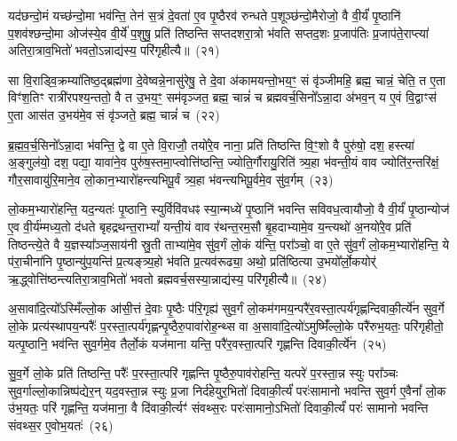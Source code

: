 यद॑छन्दो॒मं यच्छ॑न्दो॒मा भव॑न्ति॒ तेन॑ स॒त्रं दे॒वता॑ ए॒व पृ॒ष्ठैरव॑ रुन्धते प॒शूञ्छ॑न्दो॒मैरोजो॒ वै वी॒र्यं॑ पृ॒ष्ठानि॑ प॒शव॑श्छन्दो॒मा ओज॑स्ये॒व वी॒र्ये॑ प॒शुषु॒ प्रति॑ तिष्ठन्ति सप्तदशरा॒त्रो भ॑वति सप्तद॒शः प्र॒जा\-प॑तिः प्र॒जाप॑ते॒राप्त्या॑ अतिरा॒त्राव॒भितो॑ भवतो॒\-ऽन्नाद्य॑स्य॒ परि॑गृहीत्यै॥~(२१)

{\anuvakamend[{ए॒तथ्स॒प्तत्रिꣴ॑श्चच्च}]}%

सा वि॒राड्वि॒क्रम्या॑तिष्ठ॒द्ब्रह्म॑णा दे॒वेष्वन्ने॒नासु॑रेषु॒ ते दे॒वा अ॑कामयन्तो॒भय॒ꣳ॒ सं वृ॑ञ्जीमहि॒ ब्रह्म॒ चान्नं॒ चेति॒ त ए॒ता विꣳ॑श॒तिꣳ रात्री॑रपश्य॒न्ततो॒ वै त उ॒भय॒ꣳ॒ सम॑वृञ्जत॒ ब्रह्म॒ चान्नं॑ च ब्रह्मवर्च॒सिनो᳚\-ऽन्ना॒दा अ॑भव॒न् य ए॒वं वि॒द्वाꣳस॑ ए॒ता आस॑त उ॒भय॑मे॒व सं वृ॑ञ्जते॒ ब्रह्म॒ चान्नं॑ च~(२२)

ब्र॒ह्म॒व॒र्च॒सिनो᳚\-ऽन्ना॒दा भ॑वन्ति॒ द्वे वा ए॒ते वि॒राजौ॒ तयो॑रे॒व नाना॒ प्रति॑ तिष्ठन्ति वि॒ꣳ॒शो वै पुरु॑षो॒ दश॒ हस्त्या॑ अ॒ङ्गुल॑यो॒ दश॒ पद्या॒ यावा॑ने॒व पुरु॑ष॒स्तमा॒प्त्वोत्ति॑ष्ठन्ति॒ ज्योति॒र्गौरायु॒रिति॑ त्र्य॒हा भ॑वन्ती॒यं वाव ज्योति॑र॒न्तरि॑क्षं॒ गौर॒सावायु॑रि॒माने॒व लो॒कान॒भ्यारो॑हन्त्यभिपू॒र्वं त्र्य॒हा भ॑वन्त्यभिपू॒र्वमे॒व सु॑व॒र्गम्~(२३)

लो॒कम॒भ्यारो॑हन्ति॒ यद॒न्यतः॑ पृ॒ष्ठानि॒ स्युर्विवि॑वधꣴ स्या॒न्मध्ये॑ पृ॒ष्ठानि॑ भवन्ति सविवध॒त्वायौजो॒ वै वी॒र्यं॑ पृ॒ष्ठान्योज॑ ए॒व वी॒र्य॑म्मध्य॒तो द॑धते बृहद्रथन्त॒रा\-भ्यां᳚ यन्ती॒यं वाव र॑थन्त॒रम॒सौ बृ॒हदाभ्यामे॒व य॒न्त्यथो॑ अ॒नयो॑रे॒व प्रति॑ तिष्ठन्त्ये॒ते वै य॒ज्ञस्या᳚ञ्ज॒साय॑नी स्रु॒ती ताभ्या॑मे॒व सु॑व॒र्गं लो॒कं य॑न्ति॒ परा᳚ञ्चो॒ वा ए॒ते सु॑व॒र्गं लो॒कम॒भ्यारो॑हन्ति॒ ये प॑रा॒चीना॑नि पृ॒ष्ठान्यु॑प॒यन्ति॑ प्र॒त्यङ्त्र्य॒हो भ॑वति प्र॒त्यव॑रूढ्या॒ अथो॒ प्रति॑ष्ठित्या उ॒भयो᳚र्लो॒कयोर्॑ ऋ॒द्ध्वोत्ति॑ष्ठन्त्यतिरा॒त्राव॒भितो॑ भवतो ब्रह्मवर्च॒सस्या॒न्नाद्य॑स्य॒ परि॑गृहीत्यै॥~(२४)

{\anuvakamend[{वृ॒ञ्ज॒ते॒ ब्रह्म॒ चान्न॑ञ्च सुव॒र्गमे॒ते सु॑व॒र्गन्त्रयो॑विꣳशतिश्च}]}%

अ॒सावा॑दि॒त्यो᳚\-ऽस्मिँल्लो॒क आ॑सी॒त्तं दे॒वाः पृ॒ष्ठैः प॑रि॒गृह्य॑ सुव॒र्गं लो॒कम॑गमय॒न्परै॑र॒वस्ता॒त्पर्य॑गृह्णन्दिवाकी॒र्त्ये॑न सुव॒र्गे लो॒के प्रत्य॑स्थापय॒न्परैः᳚ प॒रस्ता॒त्पर्य॑गृह्णन्पृ॒ष्ठैरु॒पावा॑रोह॒न्थ्स वा अ॒सावा॑दि॒त्यो॑\-ऽमुष्मिँ॑ल्लो॒के परै॑रुभ॒यतः॒ परि॑गृहीतो॒ यत्पृ॒ष्ठानि॒ भव॑न्ति सुव॒र्गमे॒व तैर्लो॒कं यज॑माना यन्ति॒ परै॑र॒वस्ता॒त्परि॑ गृह्णन्ति दिवाकी॒र्त्ये॑न~(२५)

सु॒व॒र्गे लो॒के प्रति॑ तिष्ठन्ति॒ परैः᳚ प॒रस्ता॒त्परि॑ गृह्णन्ति पृ॒ष्ठैरु॒पाव॑रोहन्ति॒ यत्परे॑ प॒रस्ता॒न्न स्युः परा᳚ञ्चः सुव॒र्गाल्लो॒कान्निष्प॑द्येर॒न् यद॒वस्ता॒न्न स्युः प्र॒जा निर्द॑हेयुर॒भितो॑ दिवाकी॒र्त्यं॑ परः॑सामानो भवन्ति सुव॒र्ग ए॒वैनां᳚ लो॒क उ॑भ॒यतः॒ परि॑ गृह्णन्ति॒ यज॑माना॒ वै दि॑वाकी॒र्त्यꣳ॑ संवथ्स॒रः परः॑सामानो॒\-ऽभितो॑ दिवाकी॒र्त्यं॑ परः॑ सामानो भवन्ति संवथ्स॒र ए॒वोभ॒यतः॑~(२६)

